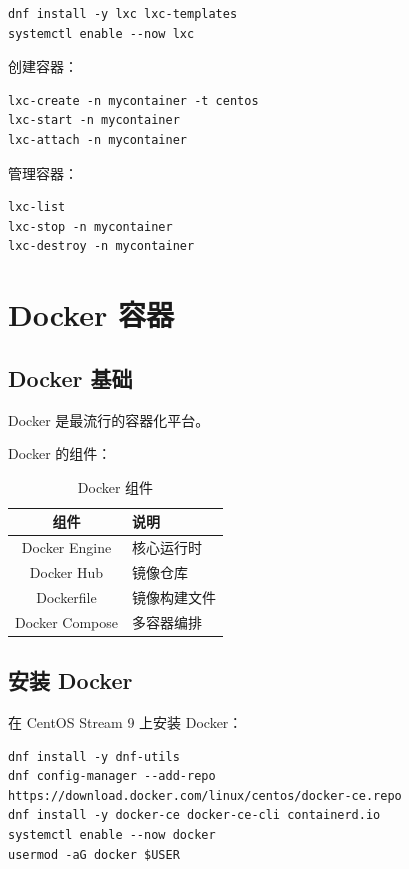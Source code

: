\documentclass[12pt,UTF8]{ctexbook}
\begin{document}
\begin{verbatim}
dnf install -y lxc lxc-templates
systemctl enable --now lxc
\end{verbatim}

创建容器：
\begin{verbatim}
lxc-create -n mycontainer -t centos
lxc-start -n mycontainer
lxc-attach -n mycontainer
\end{verbatim}

管理容器：
\begin{verbatim}
lxc-list
lxc-stop -n mycontainer
lxc-destroy -n mycontainer
\end{verbatim}

\chapter{Docker 容器}
\label{chap:docker}

\section{Docker 基础}
\label{sec:docker_basics}

Docker 是最流行的容器化平台。

Docker 的组件：
\begin{table}[htbp]
    \centering
    \caption{Docker 组件}
    \begin{tabular}{|c|p{8cm}|}
        \hline
        \textbf{组件} & \textbf{说明} \\
        \hline
        Docker Engine & 核心运行时 \\
        \hline
        Docker Hub & 镜像仓库 \\
        \hline
        Dockerfile & 镜像构建文件 \\
        \hline
        Docker Compose & 多容器编排 \\
        \hline
    \end{tabular}
\end{table}

\section{安装 Docker}
\label{sec:install_docker}

在 CentOS Stream 9 上安装 Docker：

\begin{verbatim}
dnf install -y dnf-utils
dnf config-manager --add-repo https://download.docker.com/linux/centos/docker-ce.repo
dnf install -y docker-ce docker-ce-cli containerd.io
systemctl enable --now docker
usermod -aG docker $USER
\end{verbatim}
\end{document}
